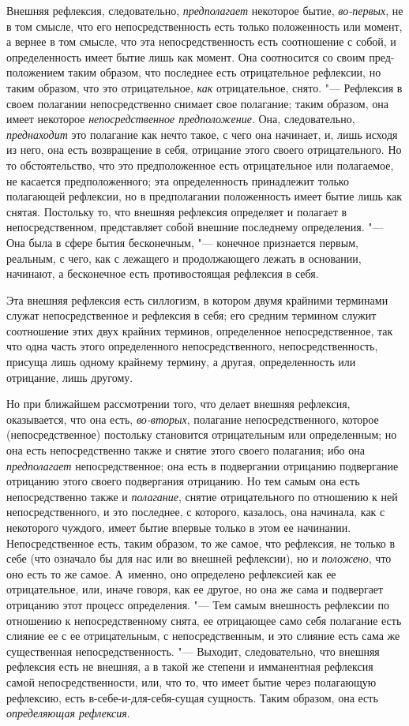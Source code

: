 Внешняя рефлексия, следовательно, {\em предполагает}
некоторое бытие, {\em во-первых}, не в том смысле, что
его непосредственность есть только положенность или момент, а вернее в том
смысле, что эта непосредственность есть соотношение с собой, и
определенность имеет бытие лишь как момент. Она соотносится со своим
пред-положением таким образом, что последнее есть отрицательное рефлексии,
но таким образом, что это отрицательное, {\em как}
отрицательное, снято. "--- Рефлексия в своем полагании непосредственно снимает
свое полагание; таким образом, она имеет некоторое
{\em непосредственное предположение}. Она,
следовательно, {\em преднаходит} это полагание как
нечто такое, с чего она начинает, и, лишь исходя из него, она есть
возвращение в себя, отрицание этого своего отрицательного. Но то
обстоятельство, что это предположенное есть отрицательное или полагаемое,
не касается предположенного; эта определенность принадлежит только
полагающей рефлексии, но в предполагании положенность имеет бытие лишь как
снятая. Постольку то, что внешняя рефлексия определяет и полагает в
непосредственном, представляет собой внешние последнему определения. "--- Она
была в сфере бытия бесконечным, "--- конечное признается первым, реальным, с
чего, как с лежащего и продолжающего лежать в основании, начинают, а
бесконечное есть противостоящая рефлексия в себя.

Эта внешняя рефлексия есть силлогизм, в котором двумя крайними терминами
служат непосредственное и рефлексия в себя; его средним термином служит
соотношение этих двух крайних терминов, определенное непосредственное, так
что одна часть этого определенного непосредственного, непосредственность,
присуща лишь одному крайнему термину, а другая, определенность или
отрицание, лишь другому.

Но при ближайшем рассмотрении того, что делает внешняя рефлексия,
оказывается, что она есть, {\em во-вторых}, полагание
непосредственного, которое (непосредственное) постольку становится
отрицательным или определенным; но она есть непосредственно также и снятие
этого своего полагания; ибо она {\em предполагает}
непосредственное; она есть в подвергании отрицанию подвергание отрицанию
этого своего подвергания отрицанию. Но тем самым она есть непосредственно
также и {\em полагание}, снятие отрицательного по
отношению к ней непосредственного, и это последнее, с которого, казалось,
она начинала, как с некоторого чуждого, имеет бытие впервые только в этом
ее начинании. Непосредственное есть, таким образом, то же самое, что
рефлексия, не только в себе (что означало бы для нас или во внешней
рефлексии), но и {\em положено}, что оно есть то же
самое. А~именно, оно определено рефлексией как ее отрицательное, или, иначе
говоря, как ее другое, но она же сама и подвергает отрицанию этот процесс
определения. "--- Тем самым внешность рефлексии по отношению к
непосредственному снята, ее отрицающее само себя полагание есть слияние ее
с ее отрицательным, с непосредственным, и это слияние есть сама же
существенная непосредственность. "--- Выходит, следовательно, что внешняя
рефлексия есть не внешняя, а в такой же степени и имманентная рефлексия
самой непосредственности, или, что то, что имеет бытие через полагающую
рефлексию, есть в-себе-и-для-себя-сущая сущность. Таким образом, она есть
{\em определяющая рефлексия}.

